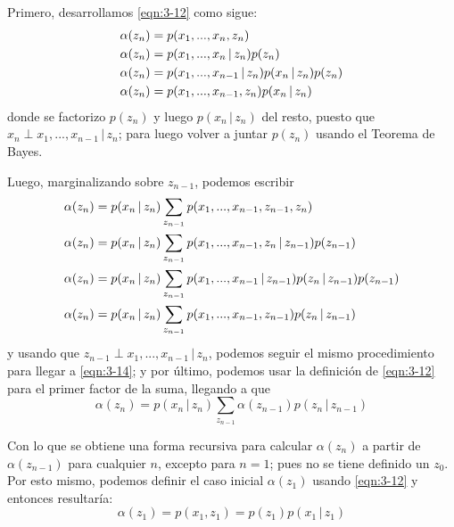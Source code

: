 Primero, desarrollamos \eqref{eqn:3-12} como sigue:
\begin{align}
  \alpha(z_n) &= p(x_1, ..., x_n, z_n)  
  \notag \\ 
  \alpha(z_n) &= p(x_1, ..., x_n \,|\, z_n)  p(z_n) 
  \notag \\ 
  \alpha(z_n) &= p(x_1, ..., x_{n-1} \,|\, z_n) p(x_n \,|\, z_n)  p(z_n) 
  \notag \\ 
  \alpha(z_n) &= p(x_1, ..., x_{n-1}, z_n) p(x_n \,|\, z_n)
  \notag
\end{align}
donde se factorizo $p(z_n)$ y luego $p(x_n \,|\, z_n)$ del resto, puesto que $x_n \perp x_1, ... , x_{n-1} \,|\, z_n$; para luego volver a juntar $p(z_n)$
usando el Teorema de Bayes.

Luego, marginalizando sobre $z_{n-1}$, podemos escribir
\begin{align}  
  \alpha(z_n) &= p(x_n \,|\, z_n) \sum_{z_{n-1}} 
    p(x_1, ..., x_{n-1}, z_{n-1}, z_n) 
    \notag \\ 
  \alpha(z_n) &= p(x_n \,|\, z_n) \sum_{z_{n-1}} 
    p(x_1, ..., x_{n-1}, z_n \,|\, z_{n-1}) p(z_{n-1})
    \notag \\ 
  \alpha(z_n) &= p(x_n \,|\, z_n) \sum_{z_{n-1}} 
    p(x_1, ..., x_{n-1} \,|\, z_{n-1}) p(z_n \,|\, z_{n-1}) p(z_{n-1})
    \notag \\ 
  \alpha(z_n) &= p(x_n \,|\, z_n) \sum_{z_{n-1}} 
    p(x_1, ..., x_{n-1}, z_{n-1}) p(z_n \,|\, z_{n-1})
    \label{eqn:3-14}
\end{align}
y usando que $z_{n-1} \perp x_1, ... , x_{n-1} \,|\, z_n$, podemos seguir el mismo procedimiento para llegar a \eqref{eqn:3-14}; y por último, podemos usar la definición de \eqref{eqn:3-12} para el primer factor de la suma, llegando a que
\begin{equation}
  \alpha(z_n) = p(x_n \,|\, z_n) \sum_{z_{n-1}} 
    \alpha(z_{n-1}) p(z_n \,|\, z_{n-1})
    \label{eqn:3-15}
\end{equation}

Con lo que se obtiene una forma recursiva para calcular $\alpha(z_n)$ a partir de $\alpha(z_{n-1})$ para cualquier $n$, excepto para $n = 1$; pues no se tiene definido un $z_0$. Por esto mismo, podemos definir el caso inicial $\alpha(z_1)$ usando \eqref{eqn:3-12} y entonces resultaría:
\begin{equation}
  \alpha(z_1) = p(x_1, z_1) = p(z_1) p(x_1 \,|\, z_1) 
  \label{eqn:3-16}
\end{equation}

